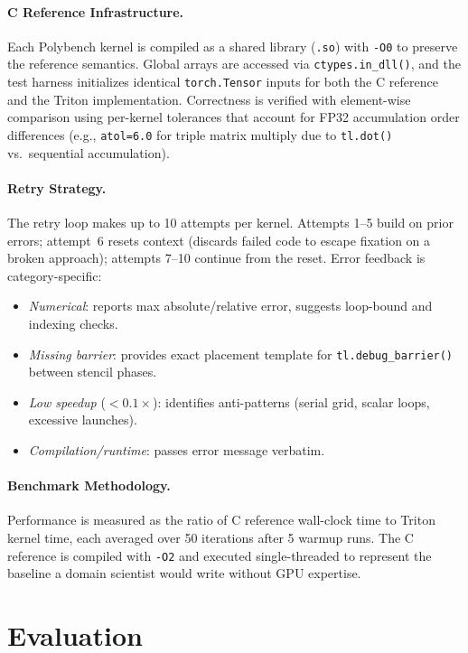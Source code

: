 \documentclass[sigconf]{acmart}
\begin{document}
\paragraph{C Reference Infrastructure.}
Each Polybench kernel is compiled as a shared library (\texttt{.so})
with \texttt{-O0} to preserve the reference semantics.  Global arrays
are accessed via \texttt{ctypes.in\_dll()}, and the test harness
initializes identical \texttt{torch.Tensor} inputs for both the C
reference and the Triton implementation.  Correctness is verified with
element-wise comparison using per-kernel tolerances that account for
FP32 accumulation order differences (e.g., \texttt{atol=6.0} for triple
matrix multiply due to \texttt{tl.dot()} vs.\ sequential accumulation).

\paragraph{Retry Strategy.}
The retry loop makes up to 10 attempts per kernel.  Attempts 1--5 build
on prior errors; attempt~6 resets context (discards failed code to
escape fixation on a broken approach); attempts 7--10 continue from the
reset.  Error feedback is category-specific:
\begin{itemize}
  \item \emph{Numerical}: reports max absolute/relative error, suggests
    loop-bound and indexing checks.
  \item \emph{Missing barrier}: provides exact placement template for
    \texttt{tl.debug\_barrier()} between stencil phases.
  \item \emph{Low speedup} ($<0.1\times$): identifies anti-patterns
    (serial grid, scalar loops, excessive launches).
  \item \emph{Compilation/runtime}: passes error message verbatim.
\end{itemize}

\paragraph{Benchmark Methodology.}
Performance is measured as the ratio of C reference wall-clock time to
Triton kernel time, each averaged over 50 iterations after 5 warmup
runs.  The C reference is compiled with \texttt{-O2} and executed
single-threaded to represent the baseline a domain scientist would
write without GPU expertise.


\section{Evaluation}
\label{sec:eval}
\end{document}
